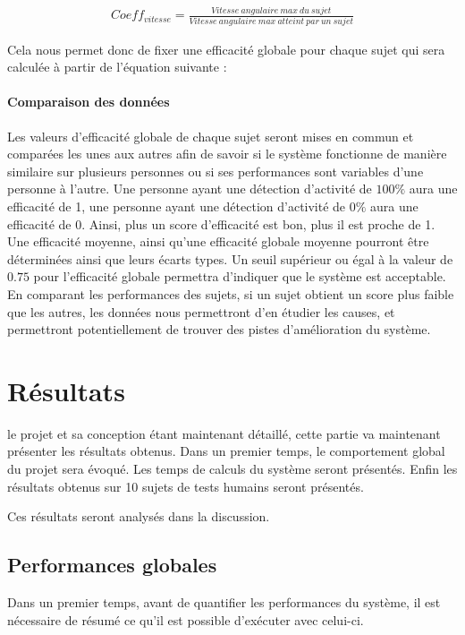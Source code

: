 \documentclass[letterpaper, twoside, 12pt, memoire, creativecommons, hyperref]{thETS}
\begin{document}
\begin{align}\label{eq:validCoeffVit}
   Coeff_{vitesse} = \frac{Vitesse\ angulaire\ max\ du\ sujet}{Vitesse\ angulaire\ max\ atteint\ par\ un\ sujet} 
\end{align}

Cela nous permet donc de fixer une efficacité globale pour chaque sujet qui sera calculée à partir de l’équation suivante : 


\subsubsection{Comparaison des données}

Les valeurs d’efficacité globale de chaque sujet seront mises en commun et comparées les unes aux autres afin de savoir si le système fonctionne de manière similaire sur plusieurs personnes ou si ses performances sont variables d’une personne à l’autre.
Une personne ayant une détection d’activité de $100\%$ aura une efficacité de 1, une personne ayant une détection d’activité de $0\%$ aura une efficacité de 0. Ainsi, plus un score d’efficacité est bon, plus il est proche de 1.
Une efficacité moyenne, ainsi qu’une efficacité globale moyenne pourront être déterminées ainsi que leurs écarts types. Un seuil supérieur ou égal à la valeur de $0.75$ pour l’efficacité globale permettra d’indiquer que le système est acceptable. En comparant les performances des sujets, si un sujet obtient un score plus faible que les autres, les données nous permettront d’en étudier les causes, et permettront potentiellement de trouver des pistes d’amélioration du système.

\chapter{Résultats}

le projet et sa conception étant maintenant détaillé, cette partie va maintenant présenter les résultats obtenus. Dans un premier temps, le comportement global du projet sera évoqué. Les temps de calculs du système seront présentés. Enfin les résultats obtenus sur 10 sujets de tests humains seront présentés. 

Ces résultats seront analysés dans la discussion.

\section{Performances globales}

Dans un premier temps, avant de quantifier les performances du système, il est nécessaire de résumé ce qu'il est possible d'exécuter avec celui-ci. 
\end{document}
